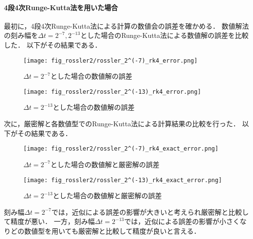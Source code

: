 \paragraph*{4段4次Runge-Kutta法を用いた場合}
最初に，4段4次Runge-Kutta法による計算の数値会の誤差を確かめる．
数値解法の刻み幅を$\Delta t = 2^{-7},2^{-13}$とした場合のRunge-Kutta法による数値解の誤差を比較した．
以下がその結果である．
\begin{figure}[H]
    \centering
    \begin{minipage}[b]{0.49\columnwidth}
        \centering
        \texttt{[image: fig\_rossler2/rossler\_2^(-7)\_rk4\_error.png]}
        \caption{$\Delta t = 2^{-7}$とした場合の数値解の誤差}
        \label{fig:rossler_2^(-7)_rk4_error}
    \end{minipage}
    \begin{minipage}[b]{0.49\columnwidth}
        \centering
        \texttt{[image: fig\_rossler2/rossler\_2^(-13)\_rk4\_error.png]}
        \caption{$\Delta t =  2^{-13}$とした場合の数値解の誤差}
        \label{fig:rossler_2^(-13)_rk4_error}
    \end{minipage}   
\end{figure}


次に，厳密解と各数値型でのRunge-Kutta法による計算結果の比較を行った．
以下がその結果である．\\
\begin{figure}[H]
    \centering
    \begin{minipage}[b]{0.49\columnwidth}
        \centering
        \texttt{[image: fig\_rossler2/rossler\_2^(-7)\_rk4\_exact\_error.png]}
        \caption{$\Delta t = 2^{-7}$とした場合の数値解と厳密解の誤差}   
        \label{fig:rossler_2^(-7)_exact_error}
    \end{minipage}
    \begin{minipage}[b]{0.49\columnwidth}
        \centering
        \texttt{[image: fig\_rossler2/rossler\_2^(-13)\_rk4\_exact\_error.png]}
        \caption{$\Delta t =  2^{-13}$とした場合の数値解と厳密解の誤差}
        \label{fig:rossler_2^(-13)_exact_error}
    \end{minipage}
\end{figure}
刻み幅$\Delta t = 2^{-7}$では，近似による誤差の影響が大きいと考えられ厳密解と比較して精度が悪い．
一方，刻み幅$\Delta t =  2^{-13}$では，近似による誤差の影響が小さくなりどの数値型を用いても厳密解と比較して精度が良いと言える．

